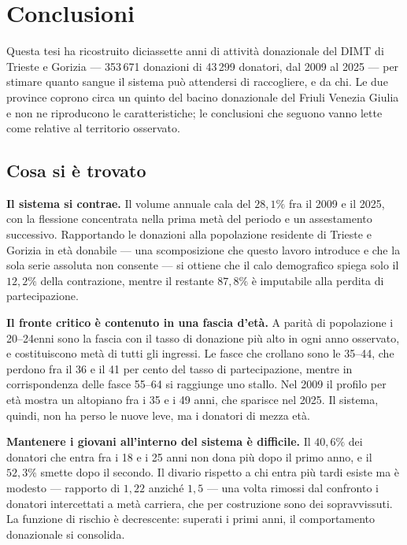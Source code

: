 \chapter{Conclusioni}
\label{ch:conclusioni}

Questa tesi ha ricostruito diciassette anni di attività donazionale del DIMT
di Trieste e Gorizia --- 353\,671 donazioni di 43\,299 donatori, dal 2009
al 2025 --- per stimare quanto sangue il sistema
può attendersi di raccogliere, e da chi. Le due province coprono circa un
quinto del bacino donazionale del Friuli Venezia Giulia e non ne riproducono
le caratteristiche; le conclusioni che seguono vanno lette come relative al
territorio osservato.

\section*{Cosa si è trovato}

\textbf{Il sistema si contrae.} Il volume annuale
cala del $28{,}1\%$ fra il 2009 e il 2025, con la flessione concentrata nella
prima metà del periodo e un assestamento successivo. Rapportando le donazioni
alla popolazione residente di Trieste e Gorizia in età donabile --- una
scomposizione che questo lavoro introduce e che la sola serie assoluta non
consente --- si ottiene che il calo demografico spiega solo il $12{,}2\%$
della contrazione, mentre il restante $87{,}8\%$ è imputabile alla perdita di partecipazione. 

\textbf{Il fronte critico è contenuto in una fascia d'età.} A parità di popolazione
i 20--24enni sono la fascia con il tasso di donazione più alto in ogni anno
osservato, e costituiscono metà di tutti gli ingressi. Le fasce che crollano
sono le 35--44, che perdono fra il 36 e il 41 per cento del tasso di
partecipazione, mentre in corrispondenza delle fasce 55--64 si raggiunge uno stallo. 
Nel 2009 il profilo per età mostra un altopiano fra i 35 e i 49 anni,
che sparisce nel 2025. Il sistema, quindi,
non ha perso le nuove leve, ma i donatori di mezza età.

\textbf{Mantenere i giovani all'interno del sistema è difficile.} 
Il $40{,}6\%$ dei donatori che
entra fra i 18 e i 25 anni non dona più dopo il primo anno, e il
$52{,}3\%$ smette dopo il secondo. Il divario rispetto a chi entra più
tardi esiste ma è modesto --- rapporto di $1{,}22$ anziché $1{,}5$ --- una
volta rimossi dal confronto i donatori intercettati a metà carriera, che per
costruzione sono dei sopravvissuti. La funzione di rischio è decrescente:
superati i primi anni, il comportamento donazionale si consolida.

